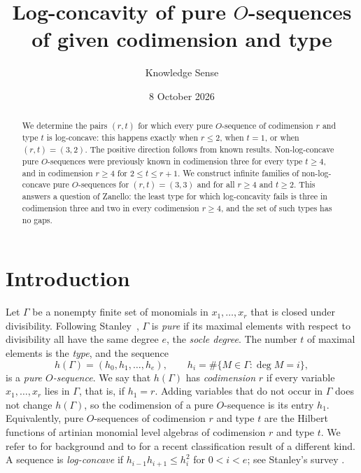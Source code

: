\documentclass{amsart}
\theoremstyle{definition}
\theoremstyle{remark}
\begin{document}
\title[Log-concavity of pure $O$-sequences]{Log-concavity of pure $O$-sequences of given codimension and type}

\author{Knowledge Sense}
\address{Knowledge Sense}

\date{8 October 2026}



\begin{abstract}
We determine the pairs $(r,t)$ for which every pure $O$-sequence of codimension $r$ and type $t$ is log-concave: this happens exactly when $r\le 2$, when $t=1$, or when $(r,t)=(3,2)$. The positive direction follows from known results. Non-log-concave pure $O$-sequences were previously known in codimension three for every type $t\ge 4$, and in codimension $r\ge 4$ for $2\le t\le r+1$. We construct infinite families of non-log-concave pure $O$-sequences for $(r,t)=(3,3)$ and for all $r\ge 4$ and $t\ge 2$. This answers a question of Zanello: the least type for which log-concavity fails is three in codimension three and two in every codimension $r\ge 4$, and the set of such types has no gaps.
\end{abstract}

\maketitle

\section{Introduction}

Let $\Gamma$ be a nonempty finite set of monomials in $x_1,\dots,x_r$ that is closed under divisibility. Following Stanley~\cite{St77}, $\Gamma$ is \emph{pure} if its maximal elements with respect to divisibility all have the same degree $e$, the \emph{socle degree}. The number $t$ of maximal elements is the \emph{type}, and the sequence
\[
h(\Gamma)=(h_0,h_1,\dots,h_e),\qquad h_i=\#\{M\in\Gamma:\deg M=i\},
\]
is a \emph{pure $O$-sequence}. We say that $h(\Gamma)$ has \emph{codimension} $r$ if every variable $x_1,\dots,x_r$ lies in $\Gamma$, that is, if $h_1=r$. Adding variables that do not occur in $\Gamma$ does not change $h(\Gamma)$, so the codimension of a pure $O$-sequence is its entry $h_1$. Equivalently, pure $O$-sequences of codimension $r$ and type $t$ are the Hilbert functions of artinian monomial level algebras of codimension $r$ and type $t$. We refer to \cite{BMMNZ12, MNZ13} for background and to \cite{HHZ25} for a recent classification result of a different kind. A sequence is \emph{log-concave} if $h_{i-1}h_{i+1}\le h_i^2$ for $0<i<e$; see Stanley's survey \cite{St89}.
\end{document}
